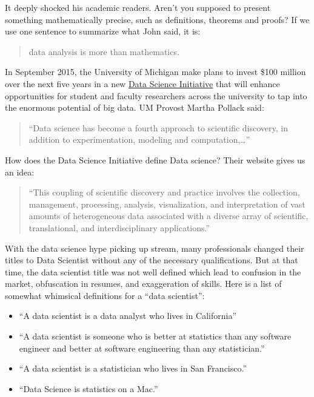 \documentclass[]{book}
\providecommand{\tightlist}{%
  \setlength{\itemsep}{0pt}\setlength{\parskip}{0pt}}
\theoremstyle{definition}
\theoremstyle{definition}
\theoremstyle{remark}
\begin{document}
It deeply shocked his academic readers. Aren't you supposed to present
something mathematically precise, such as definitions, theorems and
proofs? If we use one sentence to summarize what John said, it is:

\begin{quote}
data analysis is more than mathematics.
\end{quote}

In September 2015, the University of Michigan make plans to invest \$100
million over the next five years in a new
\href{http://www.ns.umich.edu/new/releases/23105-u-michigan-launches-100-million-data-science-initiative}{Data
Science Initiative} that will enhance opportunities for student and
faculty researchers across the university to tap into the enormous
potential of big data. UM Provost Martha Pollack said:

\begin{quote}
``Data science has become a fourth approach to scientific discovery, in
addition to experimentation, modeling and computation,\ldots{}''
\end{quote}

How does the Data Science Initiative define Data science? Their website
gives us an idea:

\begin{quote}
``This coupling of scientific discovery and practice involves the
collection, management, processing, analysis, visualization, and
interpretation of vast amounts of heterogeneous data associated with a
diverse array of scientific, translational, and interdisciplinary
applications.''
\end{quote}

With the data science hype picking up stream, many professionals changed
their titles to Data Scientist without any of the necessary
qualifications. But at that time, the data scientist title was not well
defined which lead to confusion in the market, obfuscation in resumes,
and exaggeration of skills. Here is a list of somewhat whimsical
definitions for a ``data scientist'':

\begin{itemize}
\tightlist
\item
  ``A data scientist is a data analyst who lives in California''
\item
  ``A data scientist is someone who is better at statistics than any
  software engineer and better at software engineering than any
  statistician.''
\item
  ``A data scientist is a statistician who lives in San Francisco.''
\item
  ``Data Science is statistics on a Mac.''
\end{itemize}
\end{document}

